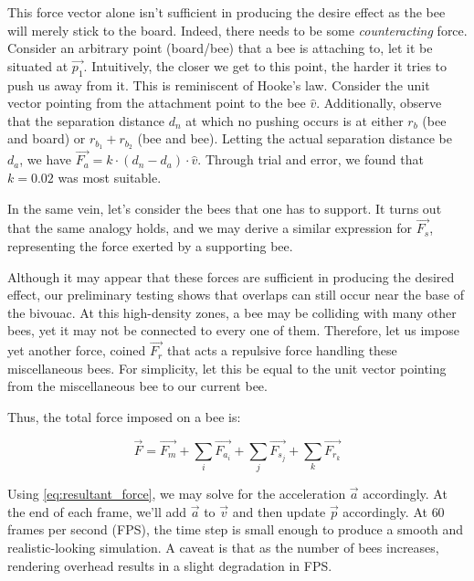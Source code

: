 \documentclass[a4paper,10pt]{article}
\begin{document}
\begin{multicols}{2}
    This force vector alone isn't sufficient in producing the desire effect as the bee will merely
    stick to the board. Indeed, there needs to be some \textit{counteracting} force. Consider
    an arbitrary point (board/bee) that a bee is attaching to, let it be situated at $\vec{p_{1}}$.
    Intuitively, the closer we get to this point, the harder it tries to push us away from it.
    This is reminiscent of Hooke's law. Consider the unit vector pointing from the attachment
    point to the bee $\hat{v}$. Additionally, observe that the separation distance $d_{n}$ at which no
    pushing occurs is at either $r_{b}$ (bee and board) or $r_{b_{1}}+r_{b_{2}}$ (bee and bee).
    Letting the actual separation distance be $d_{a}$, we have
    $\vec{F_{a}} = k \cdot (d_{n}-d_{a}) \cdot \hat{v}$. Through trial and error, we found that
    $k = 0.02$ was most suitable.

    In the same vein, let's consider the bees that one has to support. It turns out that the
    same analogy holds, and we may derive a similar expression for $\vec{F_{s}}$, representing
    the force exerted by a supporting bee.

    Although it may appear that these forces are sufficient
    in producing the desired effect, our preliminary testing shows that overlaps can still occur
    near the base of the bivouac. At this high-density zones, a bee may be colliding with many
    other bees, yet it may not be connected to every one of them. Therefore, let us impose yet
    another force, coined $\vec{F_{r}}$ that acts a repulsive force handling these miscellaneous
    bees. For simplicity, let this be equal to the unit vector pointing from the miscellaneous
    bee to our current bee.

    Thus, the total force imposed on a bee is:

    \begin{equation}
        \label{eq:resultant_force}
        \vec{F} = \vec{F_{m}} + \sum_{i}^{}\vec{F_{a_{i}}} + \sum_{j}^{}\vec{F_{s_{j}}} + \sum_{k}^{}\vec{F_{r_{k}}}
    \end{equation}

    Using \eqref{eq:resultant_force}, we may solve for the acceleration $\vec{a}$ accordingly.
    At the end of each frame, we'll add $\vec{a}$ to $\vec{v}$ and then update $\vec{p}$
    accordingly. At $60$ frames per second (FPS), the time step is small enough to produce
    a smooth and realistic-looking simulation. A caveat is that as the number of bees
    increases, rendering overhead results in a slight degradation in FPS.


\end{multicols}
\end{document}
